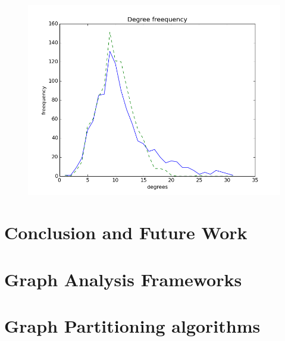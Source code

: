 \documentclass[12pt]{report}
\numberwithin{figure}{section}
\numberwithin{table}{section}
\begin{document}
\begin{figure}[H]
\centering
\includegraphics[scale=0.8]{images/ddas2}

\end{figure}

\chapter{Conclusion and Future Work }


\newpage
\begin{appendices}


\chapter{Graph Analysis Frameworks}



\chapter{Graph Partitioning algorithms}




\end{appendices}
\end{document}
